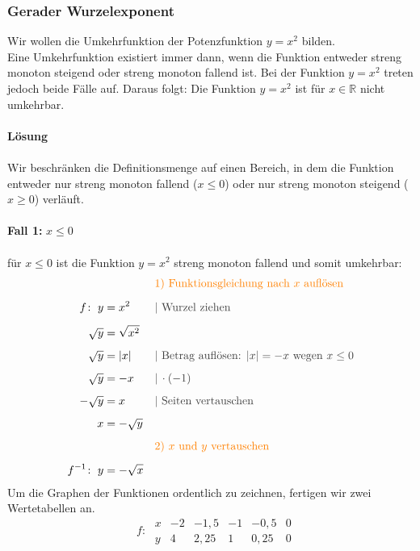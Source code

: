 \begin{multicols}{2}
    \subsubsection{Gerader Wurzelexponent}
    \vspace{-4mm}
    Wir wollen die Umkehrfunktion der Potenzfunktion $y = x^2$ bilden.\\
    Eine Umkehrfunktion existiert immer dann, wenn die Funktion entweder streng monoton steigend oder streng monoton fallend ist.
    Bei der Funktion $y = x^2$ treten jedoch beide Fälle auf. Daraus folgt: Die Funktion  $y = x^2$
    ist für $x \in \mathbb{R}$ nicht umkehrbar.\\~\\
    \textbf{Lösung}\\~\\
    Wir beschränken die Definitionsmenge auf einen Bereich, in dem die Funktion entweder nur streng monoton fallend ($x \leq 0$) oder nur streng monoton steigend ($x \geq 0$) verläuft.\\~\\
    \textbf{Fall 1:} $x \leq 0$\\~\\
    für $x \leq 0$ ist die Funktion $y = x^2$ streng monoton fallend und somit umkehrbar:
    \begin{align*} & &&{\color{orange}\text{1) Funktionsgleichung nach $x$ auflösen}} \\[5px] f\colon\; y &= x^2 &&{\color{darkgray}| \text{ Wurzel ziehen}} \\[5px] \sqrt{y} &= \sqrt{x^2} \\[5px] \sqrt{y} &= |x| &&{\color{darkgray}| \text{ Betrag auflösen: } |x| = -x \text{ wegen } x \leq 0} \\[5px] \sqrt{y} &= -x &&{\color{darkgray}|\, \cdot (-1)} \\[5px] -\sqrt{y} &= x &&{\color{darkgray}| \text{ Seiten vertauschen}} \\[5px] x &= -\sqrt{y} \\[5px] & &&{\color{orange}\text{2) $x$ und $y$ vertauschen}} \\[5px] f^{-1}\colon\; y &= -\sqrt{x} \end{align*}
    Um die Graphen der Funktionen ordentlich zu zeichnen, fertigen wir zwei Wertetabellen an.
    \[ \phantom{^{-1}}f\colon\; \begin{array}{r|c|c|c|c|c} x & -2 & -1{,}5 & -1 & -0{,}5 & 0 \\ \hline y & 4 & 2{,}25 & 1 & 0{,}25 & 0 \end{array}\]

\end{multicols}
